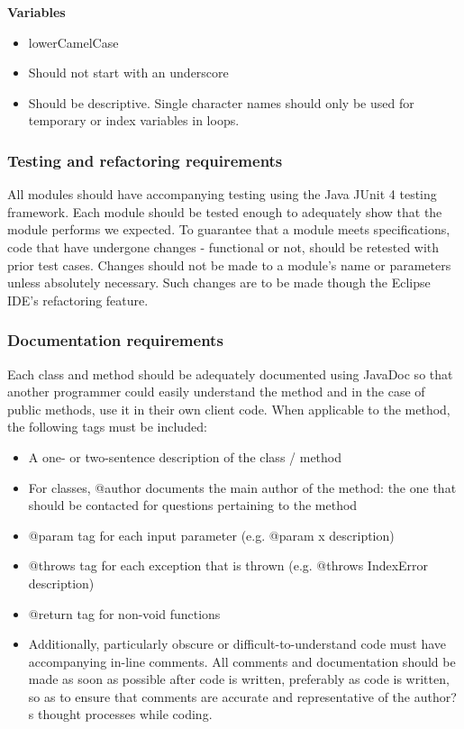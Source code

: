 \documentclass{article}
\begin{document}
\noindent\textbf{Variables}
\begin{itemize}
\item lowerCamelCase
\item Should not start with an underscore
\item Should be descriptive. Single character names should only be used for temporary or index variables in loops.
\end{itemize}

\subsubsection{Testing and refactoring requirements}
All modules should have accompanying testing using the Java JUnit 4 testing framework. Each module should be tested enough to adequately show that the module performs we expected. To guarantee that a module meets specifications, code that have undergone changes - functional or not, should be retested with prior test cases. Changes should not be made to a module's name or parameters unless absolutely necessary. Such changes are to be made though the Eclipse IDE's refactoring feature.

\subsubsection{Documentation requirements}
Each class and method should be adequately documented using JavaDoc so that another programmer could easily understand the method and in the case of public methods, use it in their own client code. When applicable to the method, the following tags must be included:
\begin{itemize}
\item A one- or two-sentence description of the class / method
\item For classes, @author documents the main author of the method: the one that should be contacted for questions pertaining to the method
\item @param tag for each input parameter (e.g. @param x description)
\item @throws tag for each exception that is thrown (e.g. @throws IndexError description)
\item @return tag for non-void functions
\item Additionally, particularly obscure or difficult-to-understand code must have accompanying in-line comments. All comments and documentation should be made as soon as possible after code is written, preferably as code is written, so as to ensure that comments are accurate and representative of the author?s thought processes while coding.
\end{itemize}
\end{document}
